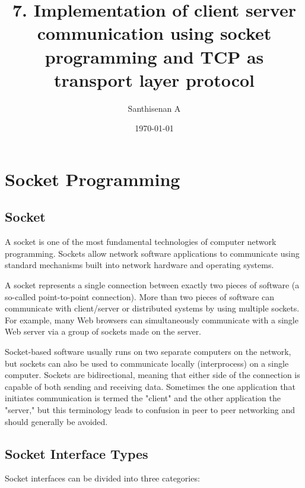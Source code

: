 \documentclass[a4paper,12pt]{article}
\begin{document}
    \title{7. Implementation of client server communication using socket programming and TCP as transport layer protocol}
    \author{Santhisenan A}
    \date{\today}
    \maketitle

\section{Socket Programming}

\subsection{Socket}
A socket is one of the most fundamental technologies of computer network programming. Sockets allow network software applications to communicate using standard mechanisms built into network hardware and operating systems.


A socket represents a single connection between exactly two pieces of software (a so-called point-to-point connection). More than two pieces of software can communicate with client/server or distributed systems by using multiple sockets. For example, many Web browsers can simultaneously communicate with a single Web server via a group of sockets made on the server.


Socket-based software usually runs on two separate computers on the network, but sockets can also be used to communicate locally (interprocess) on a single computer. Sockets are bidirectional, meaning that either side of the connection is capable of both sending and receiving data. Sometimes the one application that initiates communication is termed the "client" and the other application the "server," but this terminology leads to confusion in peer to peer networking and should generally be avoided.

\subsection{Socket Interface Types}

Socket interfaces can be divided into three categories:
\end{document}
